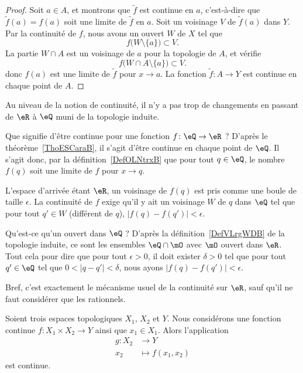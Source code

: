 \begin{proof}
	Soit \( a\in A\), et montrons que \( \tilde f\) est continue en \( a\), c'est-à-dire que \( \tilde f(a)=f(a)\) soit une limite de \( \tilde f\) en \( a\). Soit un voisinage \( V\) de \( \tilde f(a)\) dans \( Y\). Par la continuité de \( f\), nous avons un ouvert \( W\) de \( X\) tel que
	\begin{equation}
		f\big( W\setminus\{ a \} \big)\subset V.
	\end{equation}
	La partie \( W\cap A\) est un voisinage de \( a\) pour la topologie de \( A\), et vérifie
	\begin{equation}
		f\big( W\cap A\setminus\{ a \} \big)\subset V.
	\end{equation}
	donc \( f(a)\) est une limite de \( \tilde f\) pour \( x\to a\). La fonction \( \tilde f\colon A\to Y\) est continue en chaque point de \( A\).
\end{proof}

Au niveau de la notion de continuité, il n'y a pas trop de changements en passant de \( \eR\) à \( \eQ\) muni de la topologie induite.

\begin{example}     \label{EXooHWIIooYYbfGE}
	Que signifie d'être continue pour une fonction \( f\colon \eQ\to \eR\) ? D'après le théorème~\ref{ThoESCaraB}, il s'agit d'être continue en chaque point de \( \eQ\). Il s'agit donc, par la définition~\ref{DefOLNtrxB} que pour tout \( q\in \eQ\), le nombre \( f(q)\) soit une limite de \( f\) pour \( x\to q\).

	L'espace d'arrivée étant \( \eR\), un voisinage de \( f(q)\) est pris comme une boule de taille \( \epsilon\). La continuité de \( f\) exige qu'il y ait un voisinage \( W\) de \( q\) dans \( \eQ\) tel que pour tout \( q'\in W\) (différent de \( q\)), \( | f(q)-f(q') |<\epsilon\).

	Qu'est-ce qu'un ouvert dans \( \eQ\) ? D'après la définition~\ref{DefVLrgWDB} de la topologie induite, ce sont les ensembles \( \eQ\cap\mO\) avec \( \mO\) ouvert dans \( \eR\). Tout cela pour dire que pour tout \( \epsilon>0\), il doit exister \( \delta>0\) tel que pour tout \( q'\in \eQ\) tel que \( 0<| q-q' |<\delta\), nous ayons \( | f(q)-f(q') |<\epsilon\).

	Bref, c'est exactement le mécanisme usuel de la continuité sur \( \eR\), sauf qu'il ne faut considérer que les rationnels.
\end{example}

\begin{lemma}       \label{LEMooHAODooYSPmvH}
	Soient trois espaces topologiques \( X_1\), \( X_2\) et \( Y\). Nous considérons une fonction continue \( f\colon X_1\times X_2\to Y\) ainsi que \( x_1\in X_1\). Alors l'application
	\begin{equation}
		\begin{aligned}
			g\colon X_2 & \to Y              \\
			x_2         & \mapsto f(x_1,x_2)
		\end{aligned}
	\end{equation}
	est continue.
\end{lemma}


